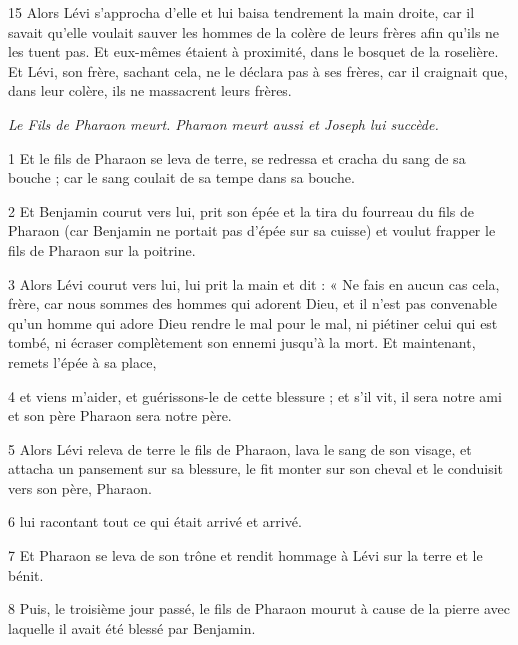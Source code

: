 \par 15 Alors Lévi s'approcha d'elle et lui baisa tendrement la main droite, car il savait qu'elle voulait sauver les hommes de la colère de leurs frères afin qu'ils ne les tuent pas. Et eux-mêmes étaient à proximité, dans le bosquet de la roselière. Et Lévi, son frère, sachant cela, ne le déclara pas à ses frères, car il craignait que, dans leur colère, ils ne massacrent leurs frères.


\par \textit{Le Fils de Pharaon meurt. Pharaon meurt aussi et Joseph lui succède.}

\par 1 Et le fils de Pharaon se leva de terre, se redressa et cracha du sang de sa bouche ; car le sang coulait de sa tempe dans sa bouche.

\par 2 Et Benjamin courut vers lui, prit son épée et la tira du fourreau du fils de Pharaon (car Benjamin ne portait pas d'épée sur sa cuisse) et voulut frapper le fils de Pharaon sur la poitrine.

\par 3 Alors Lévi courut vers lui, lui prit la main et dit : « Ne fais en aucun cas cela, frère, car nous sommes des hommes qui adorent Dieu, et il n'est pas convenable qu'un homme qui adore Dieu rendre le mal pour le mal, ni piétiner celui qui est tombé, ni écraser complètement son ennemi jusqu'à la mort. Et maintenant, remets l'épée à sa place,

\par 4 et viens m'aider, et guérissons-le de cette blessure ; et s'il vit, il sera notre ami et son père Pharaon sera notre père.

\par 5 Alors Lévi releva de terre le fils de Pharaon, lava le sang de son visage, et attacha un pansement sur sa blessure, le fit monter sur son cheval et le conduisit vers son père, Pharaon.

\par 6 lui racontant tout ce qui était arrivé et arrivé.

\par 7 Et Pharaon se leva de son trône et rendit hommage à Lévi sur la terre et le bénit.

\par 8 Puis, le troisième jour passé, le fils de Pharaon mourut à cause de la pierre avec laquelle il avait été blessé par Benjamin.

